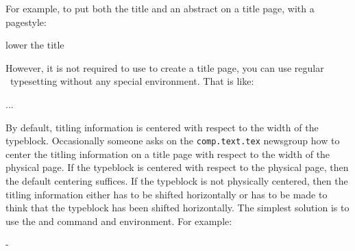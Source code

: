    For example, to put both the title and an abstract 
on a title page,
with a  pagestyle:
\begin{lcode}

\begin{titlingpage}
\setlength{\droptitle}{30pt} lower the title
\maketitle
\begin{abstract}...\end{abstract}
\end{titlingpage}
\end{lcode}

However, it is not required to use  to create a
title page, you can use regular \ltx\ typesetting without any special
environment.  That is like:
\begin{lcode}
\pagestyle{empty}
\cleardoublepage
...
\end{lcode}

   By default, titling information is centered with respect to the
width of the typeblock.
   Occasionally someone asks on the \texttt{comp.text.tex} newsgroup how
to center the titling information on a title page 
with respect to the width of the physical 
page. If the typeblock is centered with respect to the physical page,
then the default centering suffices. If the typeblock is not physically
centered, then the titling information either has to be shifted 
horizontally or \cmd{\maketitle} has to be made to think that the typeblock
has been shifted horizontally. The simplest solution is to use the
\cmd{\calccentering} and  command and environment. For
example:
\begin{lcode}
\begin{titlingpage}
  \calccentering{\unitlength}
  \begin{adjustwidth*}{\unitlength}{-\unitlength}
    \maketitle
  \end{adjustwidth*}
\end{titlingpage}
\end{lcode}

